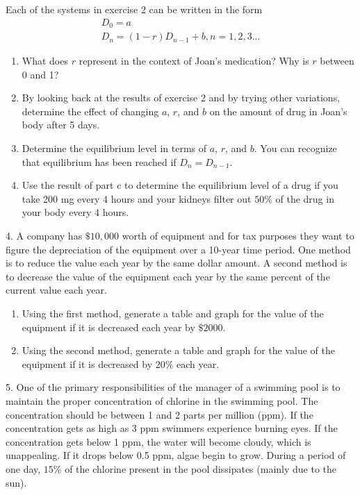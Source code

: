 \documentclass[10pt,]{book}
\theoremstyle{plain}
\theoremstyle{definition}
\theoremstyle{definition}
\theoremstyle{definition}
\numberwithin{equation}{section}
\begin{document}
\begin{exerciselist}
Each of the systems in exercise 2 can be written in the form%
\begin{gather*}
D_0=a\\
D_n=(1-r) D_{n-1}+b, n=1,2,3...
\end{gather*}
\leavevmode%
\begin{enumerate}[label=(\alph*)]
\item\hypertarget{li-15}{}What does \(r\) represent in the context of Joan's medication?  Why is \(r\) between 0 and 1?%
\item\hypertarget{li-16}{}By looking back at the results of exercise 2 and by trying other variations, determine the effect of changing \(a\), \(r\), and \(b\) on the amount of drug in Joan's body after 5 days.%
\item\hypertarget{li-17}{}Determine the equilibrium level in terms of \(a\), \(r\), and \(b\).  You can recognize that equilibrium has been reached if  \(D_n=D_{n-1}\).%
\item\hypertarget{li-18}{}Use the result of part c to determine the equilibrium level of a drug if you take 200 mg every 4 hours and your kidneys filter out \(50\%\) of the drug in your body every 4 hours.%
\end{enumerate}
%
\par\smallskip
\item[4.]\hypertarget{exercise-6}{}\hypertarget{p-24}{}%
A company has \(\$10,000\) worth of equipment and for tax purposes they want to figure the depreciation of the equipment over a 10-year time period.  One method is to reduce the value each year by the same dollar amount.  A second method is to decrease the value of the equipment each year by the same percent of the current value each year. \leavevmode%
\begin{enumerate}[label=(\alph*)]
\item\hypertarget{li-19}{}Using the first method, generate a table and graph for the value of the equipment if it is  decreased each year by \(\$2000\).%
\item\hypertarget{li-20}{}Using the second method, generate a table and graph for the value of the equipment if it is decreased by \(20\%\) each year.%
\end{enumerate}
%
\par\smallskip
\item[5.]\hypertarget{exercise-7}{}\hypertarget{p-25}{}%
One of the primary responsibilities of the manager of a swimming pool is to maintain the proper concentration of chlorine in the swimming pool.  The concentration should be between 1 and 2 parts per million (ppm).  If the concentration gets as high as 3 ppm swimmers experience burning eyes.  If the concentration gets below 1 ppm, the water will become cloudy, which is unappealing.  If it drops below 0.5 ppm, algae begin to grow.  During a period of one day, \(15\%\) of the chlorine present in the pool dissipates (mainly due to the sun). \leavevmode%

\end{exerciselist}
\end{document}
